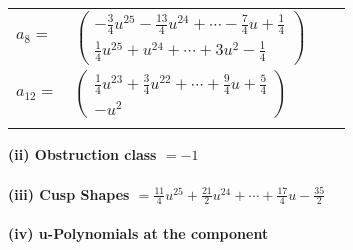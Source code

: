 \documentclass[1p]{elsarticle_modified}
\theoremstyle{definition}
\begin{document}
\begin{tabular}{m{7pt} m{180pt} m{7pt} m{180pt} }
\flushright $a_{8}=$&$\begin{pmatrix}-\frac{3}{4} u^{25}-\frac{13}{4} u^{24}+\cdots-\frac{7}{4} u+\frac{1}{4}\\\frac{1}{4} u^{25}+u^{24}+\cdots+3 u^2-\frac{1}{4}\end{pmatrix}$ \\
\flushright $a_{12}=$&$\begin{pmatrix}\frac{1}{4} u^{23}+\frac{3}{4} u^{22}+\cdots+\frac{9}{4} u+\frac{5}{4}\\- u^2\end{pmatrix}$\\&\end{tabular}
\flushleft \textbf{(ii) Obstruction class $= -1$}\\~\\
\flushleft \textbf{(iii) Cusp Shapes $= \frac{11}{4} u^{25}+\frac{21}{2} u^{24}+\cdots+\frac{17}{4} u-\frac{35}{2}$}\\~\\
\newpage\renewcommand{\arraystretch}{1}
\flushleft \textbf{(iv) u-Polynomials at the component}\newline \\
\end{document}
